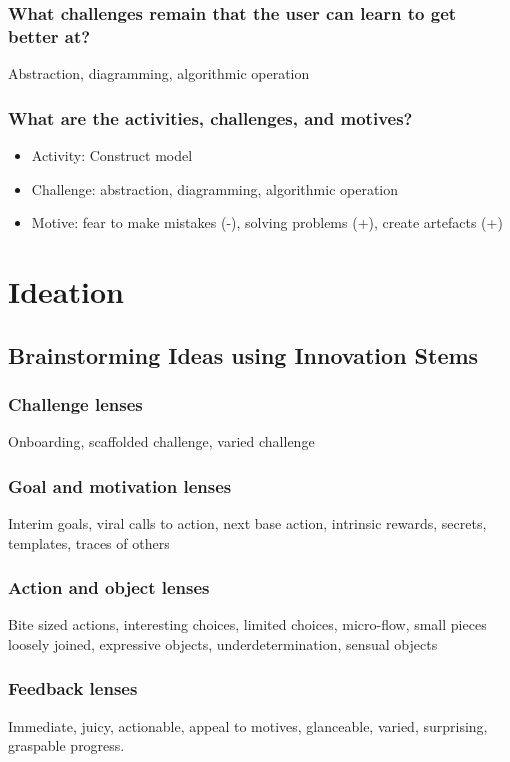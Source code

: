 \documentclass[12pt, a4paper]{report}
\begin{document}
\begin{appendices}
\subsubsection{What challenges remain that the user can learn to get better at?}
Abstraction, diagramming, algorithmic operation
\subsubsection{What are the activities, challenges, and motives?}
\begin{itemize}
\item Activity: Construct model 
\item Challenge: abstraction, diagramming, algorithmic operation
\item Motive: fear to make mistakes (-), solving problems (+), create artefacts (+)
\end{itemize}

\section{Ideation}
\subsection{Brainstorming Ideas using Innovation Stems}
\subsubsection{Challenge lenses}
Onboarding, scaffolded challenge, varied challenge 
\subsubsection{Goal and motivation lenses}
Interim goals, viral calls to action, next base action, intrinsic rewards, secrets, templates, traces of others
\subsubsection{Action and object lenses}
Bite sized actions, interesting choices, limited choices, micro-flow, small pieces loosely joined, expressive objects, underdetermination, sensual objects
\subsubsection{Feedback lenses}
Immediate, juicy, actionable, appeal to motives, glanceable, varied, surprising, graspable progress.


\end{appendices}
\end{document}
